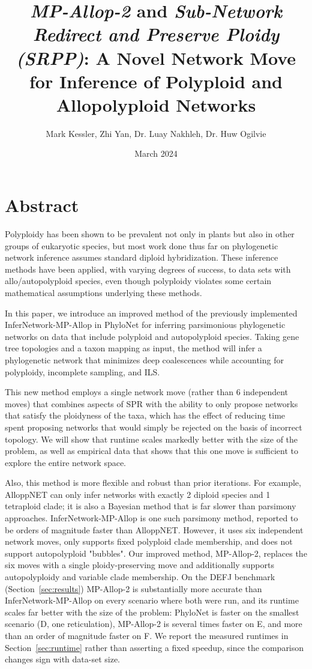 \documentclass{article}
\title{\textit{MP-Allop-2} and  \textit{Sub-Network Redirect and Preserve Ploidy (SRPP)}: A Novel Network Move for Inference of Polyploid and Allopolyploid Networks}
\author{Mark Kessler, Zhi Yan, Dr. Luay Nakhleh, Dr. Huw Ogilvie}
\date{March 2024}
\begin{document}
\maketitle

\section{Abstract}
Polyploidy has been shown to be prevalent not only in plants but also in other groups of eukaryotic species, but 
most work done thus far on phylogenetic network inference assumes standard diploid hybridization. 
These inference methods have been applied, with varying degrees of success, to data sets with allo/autopolyploid species, 
even though polyploidy violates some certain mathematical assumptions underlying these methods. 
  
In this paper, we introduce an improved method of the previously implemented InferNetwork-MP-Allop in PhyloNet \cite{YanAllop} for inferring parsimonious phylogenetic networks on data that include polyploid 
and autopolyploid species. Taking gene tree topologies and a taxon mapping as input, the method will infer a phylogenetic network that minimizes deep coalescences while accounting for polyploidy, incomplete sampling, and ILS.
  
This new method employs a single network move (rather than 6 independent moves) that combines aspects of SPR with the ability to only propose networks that
satisfy the ploidyness of the taxa, which has the effect of reducing time spent proposing networks that would simply be rejected on the basis of incorrect topology.
We will show that runtime scales markedly better with the size of the problem, as well as empirical data that shows that this one move is sufficient to explore the entire network space.

Also, this method is more flexible and robust than prior iterations. For example, AlloppNET \cite{AlloppNET} can only infer networks with exactly 2 diploid species and 1 tetraploid clade; it is also a Bayesian method that is far slower than parsimony approaches. InferNetwork-MP-Allop \cite{YanAllop} is one such parsimony method, reported to be orders of magnitude faster than AlloppNET. However, it uses six independent network moves, only supports fixed polyploid clade membership, and does not support autopolyploid "bubbles". Our improved method, MP-Allop-2, replaces the six moves with a single ploidy-preserving move and additionally supports autopolyploidy and variable clade membership. On the DEFJ benchmark (Section~\ref{sec:results}) MP-Allop-2 is substantially more accurate than InferNetwork-MP-Allop on every scenario where both were run, and its runtime scales far better with the size of the problem: PhyloNet is faster on the smallest scenario (D, one reticulation), MP-Allop-2 is several times faster on E, and more than an order of magnitude faster on F. We report the measured runtimes in Section~\ref{sec:runtime} rather than asserting a fixed speedup, since the comparison changes sign with data-set size.
\end{document}
